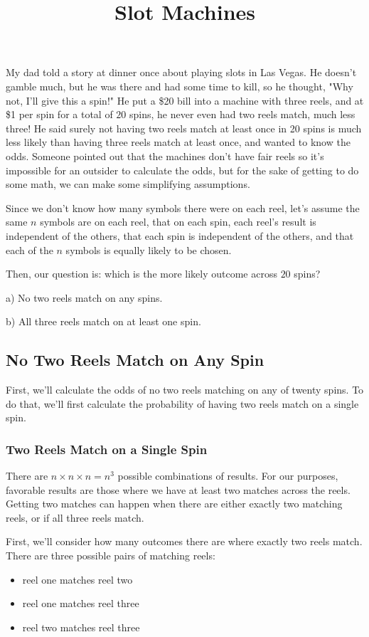\documentclass{article}
\title{Slot Machines}
\begin{document}
My dad told a story at dinner once about playing slots in Las Vegas. He doesn't gamble much, but he was there and had some time to kill, so he thought, "Why not, I'll give this a spin!" He put a \$20 bill into a machine with three reels, and at \$1 per spin for a total of $20$ spins, he never even had two reels match, much less three! He said surely not having two reels match at least once in 20 spins is much less likely than having three reels match at least once, and wanted to know the \@{odds}. Someone pointed out that the machines don't have fair reels so it's impossible for an outsider to calculate the odds, but for the sake of getting to do some math, we can make some simplifying assumptions.

Since we don't know how many symbols there were on each reel, let's assume the same $n$ symbols are on each reel, that on each spin, each reel's result is \@{independent} of the others, that each spin is independent of the others, and that each of the $n$ symbols is equally likely to be chosen.

Then, our question is: which is the more likely outcome across $20$ spins?

a) No two reels match on any spins.

b) All three reels match on at least one spin.

\subsection{No Two Reels Match on Any Spin}

First, we'll calculate the \@{odds} of no two reels matching on any of twenty spins. To do that, we'll first calculate the \@{probability} of having two reels match on a single spin.

\subsubsection{Two Reels Match on a Single Spin}

There are $n \times n \times n = n^3$ possible combinations of results. For our purposes, favorable results are those where we have at least two matches across the reels. Getting two matches can happen when there are either exactly two matching reels, or if all three reels match.

First, we'll consider how many outcomes there are where exactly two reels match. There are three possible pairs of matching reels:

\begin{itemize}
\item reel one matches reel two
\item reel one matches reel three
\item reel two matches reel three
\end{itemize}
\end{document}
